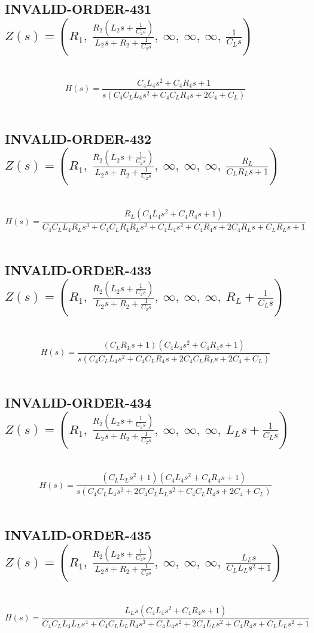 \documentclass{article}
\begin{document}
\subsection{INVALID-ORDER-431 $Z(s) = \left( R_{1}, \  \frac{R_{2} \left(L_{2} s + \frac{1}{C_{2} s}\right)}{L_{2} s + R_{2} + \frac{1}{C_{2} s}}, \  \infty, \  \infty, \  \infty, \  \frac{1}{C_{L} s}\right)$ } \ 
\textbf{\[H(s) = \frac{C_{4} L_{4} s^{2} + C_{4} R_{4} s + 1}{s \left(C_{4} C_{L} L_{4} s^{2} + C_{4} C_{L} R_{4} s + 2 C_{4} + C_{L}\right)}\] } \ 
\subsection{INVALID-ORDER-432 $Z(s) = \left( R_{1}, \  \frac{R_{2} \left(L_{2} s + \frac{1}{C_{2} s}\right)}{L_{2} s + R_{2} + \frac{1}{C_{2} s}}, \  \infty, \  \infty, \  \infty, \  \frac{R_{L}}{C_{L} R_{L} s + 1}\right)$ } \ 
\textbf{\[H(s) = \frac{R_{L} \left(C_{4} L_{4} s^{2} + C_{4} R_{4} s + 1\right)}{C_{4} C_{L} L_{4} R_{L} s^{3} + C_{4} C_{L} R_{4} R_{L} s^{2} + C_{4} L_{4} s^{2} + C_{4} R_{4} s + 2 C_{4} R_{L} s + C_{L} R_{L} s + 1}\] } \ 
\subsection{INVALID-ORDER-433 $Z(s) = \left( R_{1}, \  \frac{R_{2} \left(L_{2} s + \frac{1}{C_{2} s}\right)}{L_{2} s + R_{2} + \frac{1}{C_{2} s}}, \  \infty, \  \infty, \  \infty, \  R_{L} + \frac{1}{C_{L} s}\right)$ } \ 
\textbf{\[H(s) = \frac{\left(C_{L} R_{L} s + 1\right) \left(C_{4} L_{4} s^{2} + C_{4} R_{4} s + 1\right)}{s \left(C_{4} C_{L} L_{4} s^{2} + C_{4} C_{L} R_{4} s + 2 C_{4} C_{L} R_{L} s + 2 C_{4} + C_{L}\right)}\] } \ 
\subsection{INVALID-ORDER-434 $Z(s) = \left( R_{1}, \  \frac{R_{2} \left(L_{2} s + \frac{1}{C_{2} s}\right)}{L_{2} s + R_{2} + \frac{1}{C_{2} s}}, \  \infty, \  \infty, \  \infty, \  L_{L} s + \frac{1}{C_{L} s}\right)$ } \ 
\textbf{\[H(s) = \frac{\left(C_{L} L_{L} s^{2} + 1\right) \left(C_{4} L_{4} s^{2} + C_{4} R_{4} s + 1\right)}{s \left(C_{4} C_{L} L_{4} s^{2} + 2 C_{4} C_{L} L_{L} s^{2} + C_{4} C_{L} R_{4} s + 2 C_{4} + C_{L}\right)}\] } \ 
\subsection{INVALID-ORDER-435 $Z(s) = \left( R_{1}, \  \frac{R_{2} \left(L_{2} s + \frac{1}{C_{2} s}\right)}{L_{2} s + R_{2} + \frac{1}{C_{2} s}}, \  \infty, \  \infty, \  \infty, \  \frac{L_{L} s}{C_{L} L_{L} s^{2} + 1}\right)$ } \ 
\textbf{\[H(s) = \frac{L_{L} s \left(C_{4} L_{4} s^{2} + C_{4} R_{4} s + 1\right)}{C_{4} C_{L} L_{4} L_{L} s^{4} + C_{4} C_{L} L_{L} R_{4} s^{3} + C_{4} L_{4} s^{2} + 2 C_{4} L_{L} s^{2} + C_{4} R_{4} s + C_{L} L_{L} s^{2} + 1}\] } \ 
\end{document}
